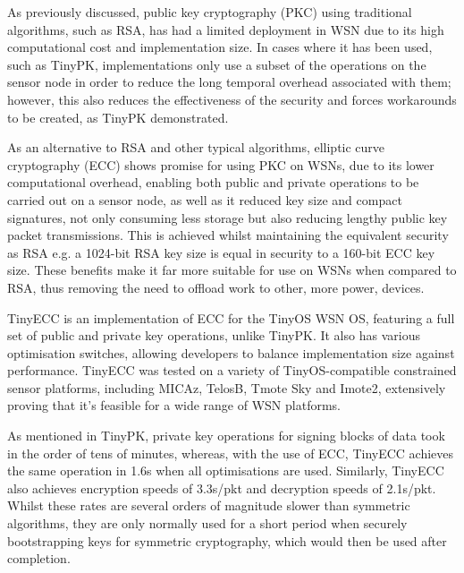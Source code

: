 As previously discussed, public key cryptography (PKC) using traditional algorithms, such as RSA, has had a limited deployment in WSN due to its high computational cost and implementation size. In cases where it has been used, such as TinyPK, implementations only use a subset of the operations on the sensor node in order to reduce the long temporal overhead associated with them; however, this also reduces the effectiveness of the security and forces workarounds to be created, as TinyPK demonstrated.

As an alternative to RSA and other typical algorithms, elliptic curve cryptography (ECC) shows promise for using PKC on WSNs, due to its lower computational overhead, enabling both public and private operations to be carried out on a sensor node, as well as it reduced key size and compact signatures, not only consuming less storage but also reducing lengthy public key packet transmissions. This is achieved whilst maintaining the equivalent security as RSA\cite{ECC} e.g. a 1024-bit RSA key size is equal in security to a 160-bit ECC key size. These benefits make it far more suitable for use on WSNs when compared to RSA, thus removing the need to offload work to other, more power, devices\cite{TinyPK}.

TinyECC \cite{TinyECC} is an implementation of ECC for the TinyOS WSN OS, featuring a full set of public and private key operations, unlike TinyPK. It also has various optimisation switches, allowing developers to balance implementation size against performance. TinyECC was tested on a variety of TinyOS-compatible constrained sensor platforms, including MICAz, TelosB, Tmote Sky and Imote2, extensively proving that it's feasible for a wide range of WSN platforms.

As mentioned in TinyPK, private key operations for signing blocks of data took in the order of tens of minutes\cite{TinyPK}, whereas, with the use of ECC, TinyECC achieves the same operation in 1.6s when all optimisations are used. Similarly, TinyECC also achieves encryption speeds of 3.3s/pkt and decryption speeds of 2.1s/pkt. Whilst these rates are several orders of magnitude slower than symmetric algorithms, they are only normally used for a short period when securely bootstrapping keys for symmetric cryptography, which would then be used after completion.
